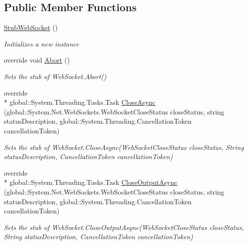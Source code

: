 \subsection*{Public Member Functions}
\begin{DoxyCompactItemize}
\item 
\hyperlink{class_system_1_1_net_1_1_web_sockets_1_1_fakes_1_1_stub_web_socket_abfb07b1da37a12b476d8753113eecb51}{Stub\-Web\-Socket} ()
\begin{DoxyCompactList}\small\item\em Initializes a new instance\end{DoxyCompactList}\item 
override void \hyperlink{class_system_1_1_net_1_1_web_sockets_1_1_fakes_1_1_stub_web_socket_a141702afa230383e99228343eac1a705}{Abort} ()
\begin{DoxyCompactList}\small\item\em Sets the stub of Web\-Socket.\-Abort()\end{DoxyCompactList}\item 
override \\*
global\-::\-System.\-Threading.\-Tasks.\-Task \hyperlink{class_system_1_1_net_1_1_web_sockets_1_1_fakes_1_1_stub_web_socket_aa9268e36c7f8edf5b8580c68532184fa}{Close\-Async} (global\-::\-System.\-Net.\-Web\-Sockets.\-Web\-Socket\-Close\-Status close\-Status, string status\-Description, global\-::\-System.\-Threading.\-Cancellation\-Token cancellation\-Token)
\begin{DoxyCompactList}\small\item\em Sets the stub of Web\-Socket.\-Close\-Async(\-Web\-Socket\-Close\-Status close\-Status, String status\-Description, Cancellation\-Token cancellation\-Token)\end{DoxyCompactList}\item 
override \\*
global\-::\-System.\-Threading.\-Tasks.\-Task \hyperlink{class_system_1_1_net_1_1_web_sockets_1_1_fakes_1_1_stub_web_socket_a4604d12dcd197d9deeeba8387fd778a9}{Close\-Output\-Async} (global\-::\-System.\-Net.\-Web\-Sockets.\-Web\-Socket\-Close\-Status close\-Status, string status\-Description, global\-::\-System.\-Threading.\-Cancellation\-Token cancellation\-Token)
\begin{DoxyCompactList}\small\item\em Sets the stub of Web\-Socket.\-Close\-Output\-Async(\-Web\-Socket\-Close\-Status close\-Status, String status\-Description, Cancellation\-Token cancellation\-Token)\end{DoxyCompactList}\item 

\end{DoxyCompactItemize}
